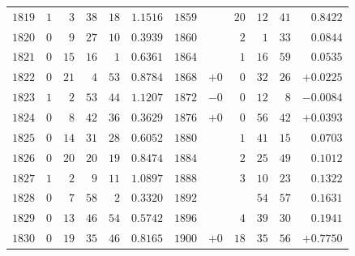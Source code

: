 \begin{lrbox}{\GaussVIEpochFrameBox}
\begin{minipage}{\dimexpr\linewidth-20pt\relax}
\begin{tabular}{r|rrrr|r||r|rrrr|r}
$1819$ & $1$ & $3$ & $38$ & $18$ & $1.1516$ & $1859$ &  & $20$ & $12$ & $41$ & $0.8422$\\
$1820$ & $0$ & $9$ & $27$ & $10$ & $0.3939$ & $1860$ &  & $2$ & $1$ & $33$ & $0.0844$\\[3pt]
$1821$ & $0$ & $15$ & $16$ & $1$ & $0.6361$ & $1864$ &  & $1$ & $16$ & $59$ & $0.0535$\\
$1822$ & $0$ & $21$ & $4$ & $53$ & $0.8784$ & $1868$ & $+0$ & $0$ & $32$ & $26$ & $+0.0225$\\
$1823$ & $1$ & $2$ & $53$ & $44$ & $1.1207$ & $1872$ & $-0$ & $0$ & $12$ & $8$ & $-0.0084$\\
$1824$ & $0$ & $8$ & $42$ & $36$ & $0.3629$ & $1876$ & $+0$ & $0$ & $56$ & $42$ & $+0.0393$\\
$1825$ & $0$ & $14$ & $31$ & $28$ & $0.6052$ & $1880$ &  & $1$ & $41$ & $15$ & $0.0703$\\[3pt]
$1826$ & $0$ & $20$ & $20$ & $19$ & $0.8474$ & $1884$ &  & $2$ & $25$ & $49$ & $0.1012$\\
$1827$ & $1$ & $2$ & $9$ & $11$ & $1.0897$ & $1888$ &  & $3$ & $10$ & $23$ & $0.1322$\\
$1828$ & $0$ & $7$ & $58$ & $2$ & $0.3320$ & $1892$ &  &  & $54$ & $57$ & $0.1631$\\
$1829$ & $0$ & $13$ & $46$ & $54$ & $0.5742$ & $1896$ &  & $4$ & $39$ & $30$ & $0.1941$\\
$1830$ & $0$ & $19$ & $35$ & $46$ & $0.8165$ & $1900$ & $+0$ & $18$ & $35$ & $56$ & $+0.7750$\\
\end{tabular}
\endgroup
\par\vspace*{16pt}
\end{minipage}
\end{lrbox}
{\setlength{\fboxrule}{1.8pt}\setlength{\fboxsep}{1.2pt}
\noindent\makebox[\linewidth][c]{\fbox{%
  \setlength{\fboxrule}{.4pt}\setlength{\fboxsep}{6pt}%
  \fbox{\usebox{\GaussVIEpochFrameBox}}}}}\par
\clearpage
\endgroup
\begingroup
\pagestyle{empty}
\newcommand{\GaussVIGathering}[2]{%
  \fancypagestyle{gaussVIGathering}{%
    \fancyhf{}%
    \renewcommand{\headrulewidth}{0pt}%
    \renewcommand{\footrulewidth}{0pt}%
    \fancyfoot[C]{\makebox[\textwidth][l]{%
      \hspace*{.025\textwidth}{\footnotesize\bfseries #1}\hfill
      {\normalsize\bfseries\textls[90]{#2}}\hspace*{.18\textwidth}}}%
  }%
  \thispagestyle{gaussVIGathering}%
}
